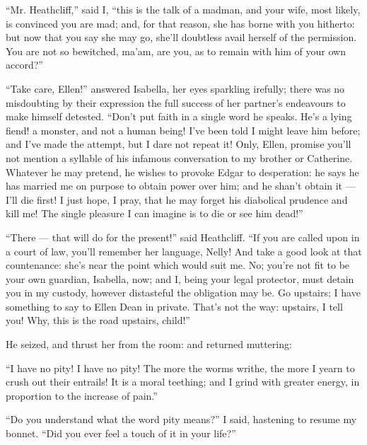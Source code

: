 \par “Mr. Heathcliff,” said I, “this is the talk of a madman, and your wife, most likely, is convinced you are mad; and, for that reason, she has borne with you hitherto: but now that you say she may go, she'll doubtless avail herself of the permission. You are not so bewitched, ma'am, are you, as to remain with him of your own accord?”
\par “Take care, Ellen!” answered Isabella, her eyes sparkling irefully; there was no misdoubting by their expression the full success of her partner's endeavours to make himself detested. “Don't put faith in a single word he speaks. He's a lying fiend! a monster, and not a human being! I've been told I might leave him before; and I've made the attempt, but I dare not repeat it! Only, Ellen, promise you'll not mention a syllable of his infamous conversation to my brother or Catherine. Whatever he may pretend, he wishes to provoke Edgar to desperation: he says he has married me on purpose to obtain power over him; and he shan't obtain it — I'll die first! I just hope, I pray, that he may forget his diabolical prudence and kill me! The single pleasure I can imagine is to die or see him dead!”
\par “There — that will do for the present!” said Heathcliff. “If you are called upon in a court of law, you'll remember her language, Nelly! And take a good look at that countenance: she's near the point which would suit me. No; you're not fit to be your own guardian, Isabella, now; and I, being your legal protector, must detain you in my custody, however distasteful the obligation may be. Go upstairs; I have something to say to Ellen Dean in private. That's not the way: upstairs, I tell you! Why, this is the road upstairs, child!”
\par He seized, and thrust her from the room: and returned muttering:
\par “I have no pity! I have no pity! The more the worms writhe, the more I yearn to crush out their entrails! It is a moral teething; and I grind with greater energy, in proportion to the increase of pain.”
\par “Do you understand what the word pity means?” I said, hastening to resume my bonnet. “Did you ever feel a touch of it in your life?”
